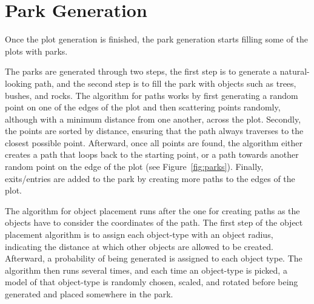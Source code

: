 \section{Park Generation}

Once the plot generation is finished, the park generation starts filling some of the plots with parks.

The parks are generated through two steps, the first step is to generate a natural-looking path, and the second step is to fill the park with objects such as trees, bushes, and rocks. 
The algorithm for paths works by first generating a random point on one of the edges of the plot and then scattering points randomly, although with a minimum distance from one another, across the plot. 
Secondly, the points are sorted by distance, ensuring that the path always traverses to the closest possible point. 
Afterward, once all points are found, the algorithm either creates a path that loops back to the starting point, or a path towards another random point on the edge of the plot (see Figure~\ref{fig:parks}).
Finally, exits/entries are added to the park by creating more paths to the edges of the plot.  

The algorithm for object placement runs after the one for creating paths as the objects have to consider the coordinates of the path.
The first step of the object placement algorithm is to assign each object-type with an object radius, indicating the distance at which other objects are allowed to be created. 
Afterward, a probability of being generated is assigned to each object type.
The algorithm then runs several times, and each time an object-type is picked, a model of that object-type is randomly chosen, scaled, and rotated before being generated and placed somewhere in the park.

